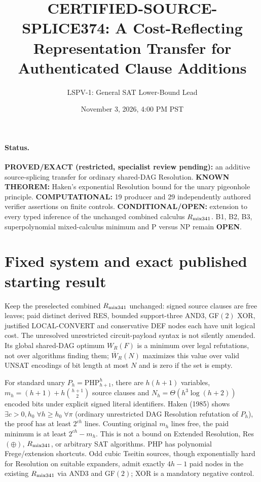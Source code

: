 \documentclass[11pt]{article}
\title{CERTIFIED-SOURCE-SPLICE374: A Cost-Reflecting Representation Transfer for Authenticated Clause Additions}
\author{LSPV-1: General SAT Lower-Bound Lead}
\date{November 3, 2026, 4:00 PM PST}
\begin{document}
\maketitle
\paragraph{Status.}
\textbf{PROVED/EXACT (restricted, specialist review pending):} an additive source-splicing transfer for ordinary shared-DAG Resolution. \textbf{KNOWN THEOREM:} Haken's exponential Resolution bound for the unary pigeonhole principle. \textbf{COMPUTATIONAL:} 19 producer and 29 independently authored verifier assertions on finite controls. \textbf{CONDITIONAL/OPEN:} extension to every typed inference of the unchanged combined calculus $R_{\rm mix341}$. B1, B2, B3, superpolynomial mixed-calculus minimum and P versus NP remain \textbf{OPEN}.

\section*{Fixed system and exact published starting result}
Keep the preselected combined $R_{\rm mix341}$ unchanged: signed source clauses are free leaves; paid distinct derived RES, bounded support-three AND3, GF$(2)$ XOR, justified LOCAL-CONVERT and conservative DEF nodes each have unit logical cost. The unresolved unrestricted circuit-payload syntax is not silently amended. Its global shared-DAG optimum $W_R(F)$ is a minimum over legal refutations, not over algorithms finding them; $\overline W_R(N)$ maximizes this value over valid UNSAT encodings of bit length at most $N$ and is zero if the set is empty.

For standard unary $P_h=\mathrm{PHP}^{h}_{h+1}$, there are $h(h+1)$ variables, $m_h=(h+1)+h\binom{h+1}{2}$ source clauses and $N_h=\Theta(h^3\log(h+2))$ encoded bits under explicit signed literal identifiers. Haken (1985) shows $\exists c>0,h_0\;\forall h\ge h_0\;\forall\pi$ (ordinary unrestricted DAG Resolution refutation of $P_h$), the proof has at least $2^{ch}$ lines. Counting original $m_h$ lines free, the paid minimum is at least $2^{ch}-m_h$. This is not a bound on Extended Resolution, Res$(\oplus)$, $R_{\rm mix341}$, or arbitrary SAT algorithms. PHP has polynomial Frege/extension shortcuts. Odd cubic Tseitin sources, though exponentially hard for Resolution on suitable expanders, admit exactly $4h-1$ paid nodes in the existing $R_{\rm mix341}$ via AND3 and GF$(2)$; XOR is a mandatory negative control.
\end{document}

